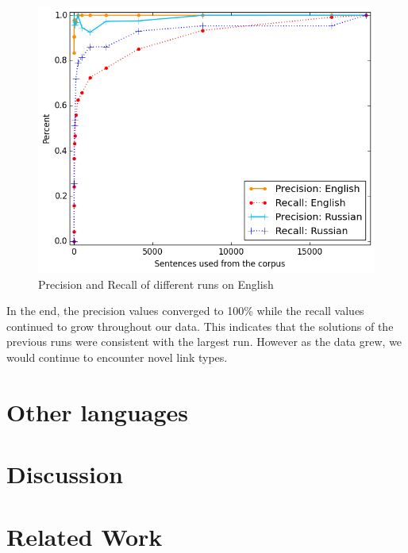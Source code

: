 \documentclass[11pt]{article}
\begin{document}
\begin{figure}[ht!]
  \centering
  \includegraphics[width=\linewidth, keepaspectratio=true]{figure/precision_recall.png}
  \caption{Precision and Recall of different runs on English}
\end{figure}

In the end, the precision values converged to 100\% while the recall values continued to grow throughout our data. This indicates that the solutions of the previous runs were consistent with the largest run. However as the data grew, we would continue to encounter novel link types.



\section{Other languages}




\section{Discussion}




\section{Related Work}







\end{document}
